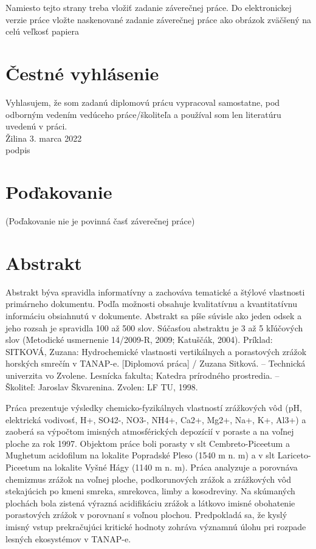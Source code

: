 \newpage %
\thispagestyle{empty}
\begingroup
\begin{LARGE}
	Namiesto tejto strany treba vložiť zadanie záverečnej práce.
	Do elektronickej verzie práce vložte naskenované zadanie záverečnej práce ako obrázok zväčšený na celú veľkosť papiera
\end{LARGE}
\endgroup

\newpage %
\thispagestyle{empty}
\mbox{}
\vfill
\section*{Čestné vyhlásenie}
Vyhlasujem, že som zadanú diplomovú prácu vypracoval samostatne, pod odborným vedením vedúceho práce/školiteľa a používal som len literatúru uvedenú v práci. \\
\vspace{1cm}
Žilina 3. marca 2022 \\
\vspace{1cm}	
\null\hfill podpis

\newpage %
\thispagestyle{empty}
\mbox{}
\vfill
\section*{Poďakovanie}
(Poďakovanie nie je povinná časť záverečnej práce)

\newpage %
\thispagestyle{empty}
\section*{Abstrakt}

\hspace{1.25cm}Abstrakt býva spravidla informatívny a zachováva tematické a štýlové vlastnosti primárneho dokumentu. Podľa možnosti obsahuje kvalitatívnu a kvantitatívnu informáciu obsiahnutú v dokumente. Abstrakt sa píše súvisle ako jeden odsek a jeho rozsah je spravidla 100 až 500 slov. Súčasťou abstraktu je 3 až 5 kľúčových slov (Metodické usmernenie 14/2009-R, 2009; Katuščák, 2004).
Príklad: \\
SITKOVÁ, Zuzana: Hydrochemické vlastnosti vertikálnych a porastových zrážok horských smrečín v TANAP-e. [Diplomová práca] / Zuzana Sitková. – Technická univerzita vo Zvolene. Lesnícka fakulta; Katedra prírodného prostredia. – Školiteľ: Jaroslav Škvarenina. Zvolen: LF TU, 1998.

Práca prezentuje výsledky chemicko-fyzikálnych vlastností zrážkových vôd (pH, elektrická vodivosť, H+, SO42-, NO3-, NH4+, Ca2+, Mg2+, Na+, K+, Al3+) a zaoberá sa výpočtom imisných atmosférických depozícií v poraste a na voľnej ploche za rok 1997. Objektom práce boli porasty v slt Cembreto-Piceetum a Mughetum acidofilum na lokalite Popradské Pleso (1540 m n. m) a v slt Lariceto-Piceetum na lokalite Vyšné Hágy (1140 m n. m). Práca analyzuje a porovnáva chemizmus zrážok na voľnej ploche, podkorunových zrážok a zrážkových vôd stekajúcich po kmeni smreka, smrekovca, limby a kosodreviny.  Na skúmaných plochách bola zistená výrazná acidifikáciu zrážok a látkovo imisné obohatenie porastových zrážok v porovnaní s voľnou plochou. Predpokladá sa, že kyslý imisný vstup prekračujúci kritické hodnoty zohráva významnú úlohu pri rozpade lesných ekosystémov v TANAP-e.

